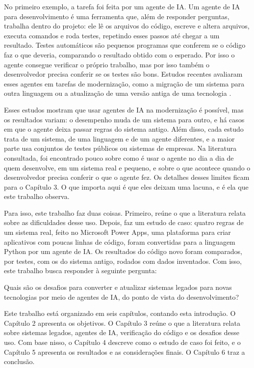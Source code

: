 No primeiro exemplo, a tarefa foi feita por um agente de IA. Um agente de IA para desenvolvimento é uma ferramenta que, além de responder perguntas, trabalha dentro do projeto: ele lê os arquivos do código, escreve e altera arquivos, executa comandos e roda testes, repetindo esses passos até chegar a um resultado. Testes automáticos são pequenos programas que conferem se o código faz o que deveria, comparando o resultado obtido com o esperado. Por isso o agente consegue verificar o próprio trabalho, mas por isso também o desenvolvedor precisa conferir se os testes são bons. Estudos recentes avaliaram esses agentes em tarefas de modernização, como a migração de um sistema para outra linguagem ou a atualização de uma versão antiga de uma tecnologia \cite{li2026repomod, liu2026migrationbench, may2025freshbrew}.

Esses estudos mostram que usar agentes de IA na modernização é possível, mas os resultados variam: o desempenho muda de um sistema para outro, e há casos em que o agente deixa passar regras do sistema antigo. Além disso, cada estudo trata de um sistema, de uma linguagem e de um agente diferentes, e a maior parte usa conjuntos de testes públicos ou sistemas de empresas. Na literatura consultada, foi encontrado pouco sobre como é usar o agente no dia a dia de quem desenvolve, em um sistema real e pequeno, e sobre o que acontece quando o desenvolvedor precisa conferir o que o agente fez. Os detalhes desses limites ficam para o Capítulo 3. O que importa aqui é que eles deixam uma lacuna, e é ela que este trabalho observa.

Para isso, este trabalho faz duas coisas. Primeiro, reúne o que a literatura relata sobre as dificuldades desse uso. Depois, faz um estudo de caso: quatro regras de um sistema real, feito no Microsoft Power Apps, uma plataforma para criar aplicativos com poucas linhas de código, foram convertidas para a linguagem Python por um agente de IA. Os resultados do código novo foram comparados, por testes, com os do sistema antigo, rodados com dados inventados. Com isso, este trabalho busca responder à seguinte pergunta:

\begin{citacao}
Quais são os desafios para converter e atualizar sistemas legados para novas tecnologias por meio de agentes de IA, do ponto de vista do desenvolvimento?
\end{citacao}

Este trabalho está organizado em seis capítulos, contando esta introdução. O Capítulo 2 apresenta os objetivos. O Capítulo 3 reúne o que a literatura relata sobre sistemas legados, agentes de IA, verificação do código e os desafios desse uso. Com base nisso, o Capítulo 4 descreve como o estudo de caso foi feito, e o Capítulo 5 apresenta os resultados e as considerações finais. O Capítulo 6 traz a conclusão.
